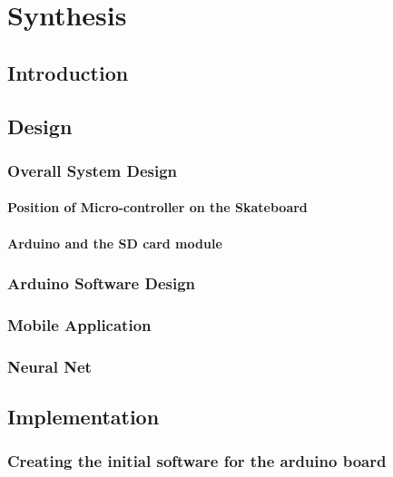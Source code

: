 \chapter{Synthesis}\label{synthesis}

\section{Introduction}\label{introduction}



\section{Design}\label{design}

\subsection{Overall System Design}\label{overallsystemdesign}

\subsubsection{Position of Micro-controller on the Skateboard}\label{mcposition}

\subsubsection{Arduino and the SD card module}\label{arduinoandsdcard}

\subsection{Arduino Software Design}\label{arduinosoftwaredesign}

\subsection{Mobile Application}\label{mobileapp}

\subsection{Neural Net}\label{neural-net}

\section{Implementation}\label{implementation}

\subsection{Creating the initial software for the arduino board}\label{initalboardsoftware}

